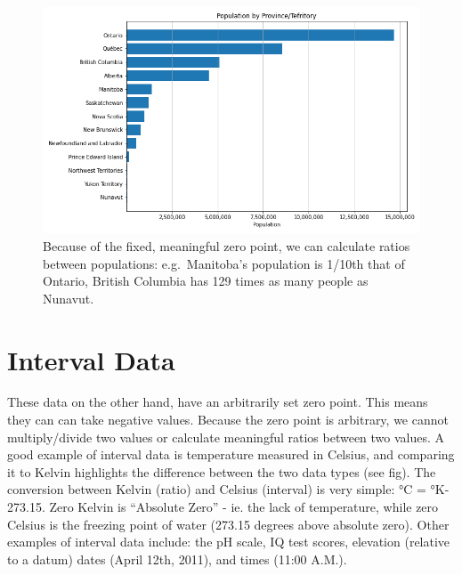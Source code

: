 \documentclass[
]{book}
\begin{document}
\begin{figure}
\centering
\includegraphics{images/03-ratio-population.png}
\caption{Because of the fixed, meaningful zero point, we can calculate ratios between populations: e.g.~Manitoba's population is 1/10th that of Ontario, British Columbia has 129 times as many people as Nunavut.}
\end{figure}

\hypertarget{interval-data}{%
\section{Interval Data}\label{interval-data}}

These data on the other hand, have an arbitrarily set zero point. This means they can can take negative values. Because the zero point is arbitrary, we cannot multiply/divide two values or calculate meaningful ratios between two values. A good example of interval data is temperature measured in Celsius, and comparing it to Kelvin highlights the difference between the two data types (see fig). The conversion between Kelvin (ratio) and Celsius (interval) is very simple: °C = °K-273.15. Zero Kelvin is ``Absolute Zero'' - ie. the lack of temperature, while zero Celsius is the freezing point of water (273.15 degrees above absolute zero). Other examples of interval data include: the pH scale, IQ test scores, elevation (relative to a datum) dates (April 12th, 2011), and times (11:00 A.M.).
\end{document}
